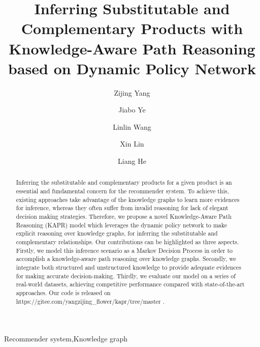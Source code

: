 \documentclass[review]{elsarticle}
\begin{document}
\begin{sloppypar}

\begin{frontmatter}
\title{Inferring Substitutable and Complementary Products with Knowledge-Aware Path Reasoning based on Dynamic Policy Network}

\author[label1]{Zijing Yang}
\author[label1]{Jiabo Ye}
\author[label1]{Linlin Wang }
\author[label1]{Xin Lin}
\author[label1]{Liang He}
\address[label1]{The Department of Computer Science and Technology, East China Normal University, Shanghai 200241, China.}

\begin{abstract}
Inferring the substitutable and complementary products for a given product is an essential and fundamental concern for the recommender system.
To achieve this, existing approaches take advantage of the knowledge graphs to learn more evidences for inference, whereas they often suffer from invalid reasoning for lack of elegant decision making strategies. Therefore, we propose a novel Knowledge-Aware Path Reasoning (KAPR) model which leverages the dynamic policy network to make explicit reasoning over knowledge graphs, for inferring the substitutable and complementary relationships. Our contributions can be highlighted as three aspects. 
Firstly, we model this inference scenario as a Markov Decision Process in order to accomplish a knowledge-aware path reasoning over knowledge graphs.
Secondly, we integrate both structured and unstructured knowledge to provide adequate evidences for making accurate decision-making.
Thirdly,  we evaluate our model on a series of real-world datasets, achieving competitive performance compared with state-of-the-art approaches.
Our code is released on https://gitee.com/yangzijing\_flower/kapr/tree/master
.

\end{abstract}

\begin{keyword}
Recommender system\sep Knowledge graph
\end{keyword}


\end{frontmatter}
\end{sloppypar}
\end{document}
